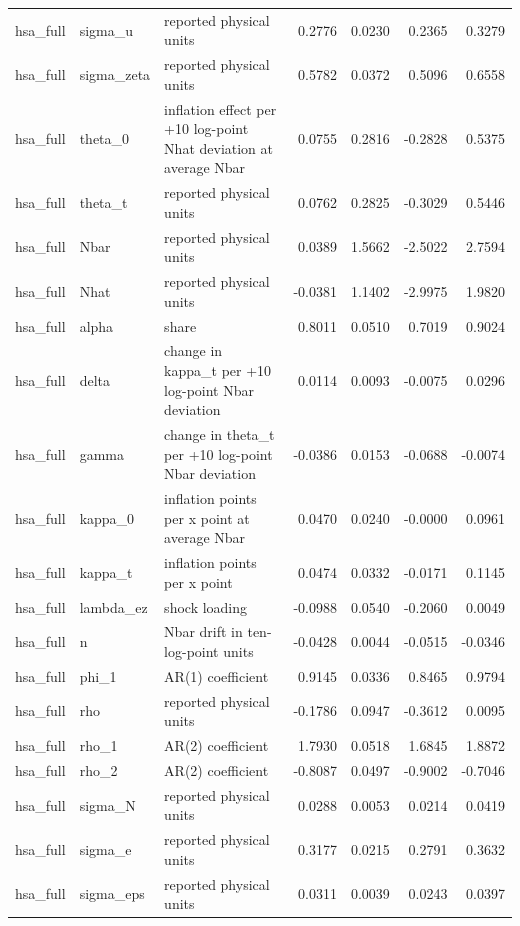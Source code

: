 \begin{tabular}{lllrrrr}
hsa\_full & sigma\_u & reported physical units & 0.2776 & 0.0230 & 0.2365 & 0.3279 \\
hsa\_full & sigma\_zeta & reported physical units & 0.5782 & 0.0372 & 0.5096 & 0.6558 \\
hsa\_full & theta\_0 & inflation effect per +10 log-point Nhat deviation at average Nbar & 0.0755 & 0.2816 & -0.2828 & 0.5375 \\
hsa\_full & theta\_t & reported physical units & 0.0762 & 0.2825 & -0.3029 & 0.5446 \\
hsa\_full & Nbar & reported physical units & 0.0389 & 1.5662 & -2.5022 & 2.7594 \\
hsa\_full & Nhat & reported physical units & -0.0381 & 1.1402 & -2.9975 & 1.9820 \\
hsa\_full & alpha & share & 0.8011 & 0.0510 & 0.7019 & 0.9024 \\
hsa\_full & delta & change in kappa\_t per +10 log-point Nbar deviation & 0.0114 & 0.0093 & -0.0075 & 0.0296 \\
hsa\_full & gamma & change in theta\_t per +10 log-point Nbar deviation & -0.0386 & 0.0153 & -0.0688 & -0.0074 \\
hsa\_full & kappa\_0 & inflation points per x point at average Nbar & 0.0470 & 0.0240 & -0.0000 & 0.0961 \\
hsa\_full & kappa\_t & inflation points per x point & 0.0474 & 0.0332 & -0.0171 & 0.1145 \\
hsa\_full & lambda\_ez & shock loading & -0.0988 & 0.0540 & -0.2060 & 0.0049 \\
hsa\_full & n & Nbar drift in ten-log-point units & -0.0428 & 0.0044 & -0.0515 & -0.0346 \\
hsa\_full & phi\_1 & AR(1) coefficient & 0.9145 & 0.0336 & 0.8465 & 0.9794 \\
hsa\_full & rho & reported physical units & -0.1786 & 0.0947 & -0.3612 & 0.0095 \\
hsa\_full & rho\_1 & AR(2) coefficient & 1.7930 & 0.0518 & 1.6845 & 1.8872 \\
hsa\_full & rho\_2 & AR(2) coefficient & -0.8087 & 0.0497 & -0.9002 & -0.7046 \\
hsa\_full & sigma\_N & reported physical units & 0.0288 & 0.0053 & 0.0214 & 0.0419 \\
hsa\_full & sigma\_e & reported physical units & 0.3177 & 0.0215 & 0.2791 & 0.3632 \\
hsa\_full & sigma\_eps & reported physical units & 0.0311 & 0.0039 & 0.0243 & 0.0397 \\

\end{tabular}
